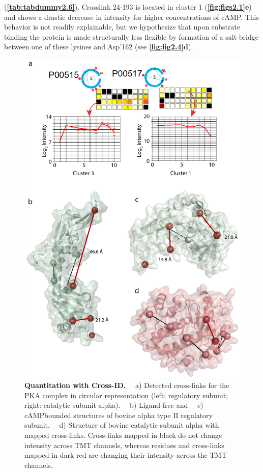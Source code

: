 (\textbf{\autoref{tab:tabdummy2.6}}). Crosslink 24-193 is located in cluster 1 (\textbf{\autoref{fig:figs2.1}e}) and shows a drastic decrease in intensity for higher concentrations of cAMP. This behavior is not readily explainable, but we hypothesize that upon substrate binding the protein is made structurally less flexible by formation of a salt-bridge between one of these lysines and Asp’162 (see \textbf{\autoref{fig:fig2.4}d}).
\begin{figure}[!htb]
  \center
  \includegraphics[]{Chapter.2/Figures/f5.png}
  \caption{
    \textbf{Quantitation with Cross-ID.} ~~a) Detected cross-links for the PKA complex in circular representation (left: regulatory subunit; right: catalytic subunit alpha). ~~b) Ligand-free and ~~c) cAMPbounded structures of bovine alpha type II regulatory subunit. ~~d)
    Structure of bovine catalytic subunit alpha with mapped cross-links. Cross-links mapped in black do not change intensity across TMT channels, whereas residues and cross-links mapped in dark red are changing their intensity across the TMT channels.
  }
  \label{fig:fig2.5}
\end{figure}


